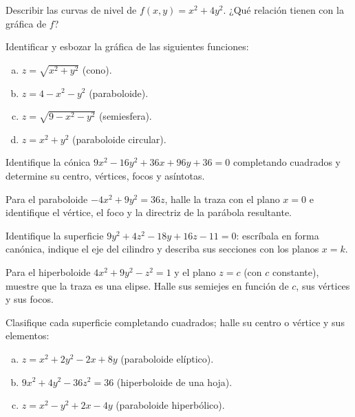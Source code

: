 \begin{prob}
Describir las curvas de nivel de $f(x,y) = x^2 + 4y^2$. ¿Qué relación
tienen con la gráfica de $f$?
\end{prob}

\begin{prob}
Identificar y esbozar la gráfica de las siguientes funciones:
\begin{enumerate}[a)]
  \item $z = \sqrt{x^2 + y^2}$ (cono).
  \item $z = 4 - x^2 - y^2$ (paraboloide).
  \item $z = \sqrt{9 - x^2 - y^2}$ (semiesfera).
  \item $z = x^2 + y^2$ (paraboloide circular).
\end{enumerate}
\end{prob}

\begin{prob}
Identifique la cónica $9x^2-16y^2+36x+96y+36=0$ completando cuadrados y
determine su centro, vértices, focos y asíntotas.
\end{prob}

\begin{prob}
Para el paraboloide $-4x^2+9y^2=36z$, halle la traza con el plano $x=0$ e
identifique el vértice, el foco y la directriz de la parábola resultante.
\end{prob}

\begin{prob}
Identifique la superficie $9y^2+4z^2-18y+16z-11=0$: escríbala en forma
canónica, indique el eje del cilindro y describa sus secciones con los
planos $x=k$.
\end{prob}

\begin{prob}
Para el hiperboloide $4x^2+9y^2-z^2=1$ y el plano $z=c$ (con $c$ constante),
muestre que la traza es una elipse. Halle sus semiejes en función de $c$, sus
vértices y sus focos.
\end{prob}

\begin{prob}
Clasifique cada superficie completando cuadrados; halle su centro o vértice y
sus elementos:
\begin{enumerate}[a)]
  \item $z=x^2+2y^2-2x+8y$ (paraboloide elíptico).
  \item $9x^2+4y^2-36z^2=36$ (hiperboloide de una hoja).
  \item $z=x^2-y^2+2x-4y$ (paraboloide hiperbólico).
\end{enumerate}
\end{prob}

